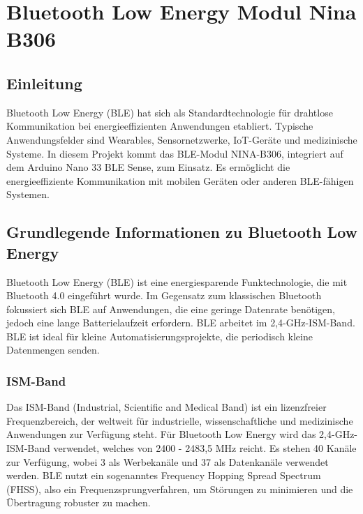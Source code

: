 
\chapter{Bluetooth Low Energy Modul Nina B306}
\label{Nina}

\section{Einleitung}
Bluetooth Low Energy (BLE) hat sich als Standardtechnologie für drahtlose Kommunikation bei energieeffizienten Anwendungen etabliert. Typische Anwendungsfelder sind Wearables, Sensornetzwerke, IoT-Geräte und medizinische Systeme. In diesem Projekt kommt das BLE-Modul NINA-B306, integriert auf dem Arduino Nano 33 BLE Sense, zum Einsatz. Es ermöglicht die energieeffiziente Kommunikation mit mobilen Geräten oder anderen BLE-fähigen Systemen. \cite{Tosi:2017} \cite{UBLOX:2023}

\section{Grundlegende Informationen zu Bluetooth Low Energy}
Bluetooth Low Energy (BLE) ist eine energiesparende Funktechnologie, die mit Bluetooth 4.0 eingeführt wurde. Im Gegensatz zum klassischen Bluetooth fokussiert sich BLE auf Anwendungen, die eine geringe Datenrate benötigen, jedoch eine lange Batterielaufzeit erfordern. BLE arbeitet im 2,4-GHz-ISM-Band. BLE ist ideal für kleine Automatisierungsprojekte, die periodisch kleine Datenmengen senden.\cite{Tosi:2017} \cite{UBLOX:2023}
\subsection{ISM-Band}
Das ISM-Band (Industrial, Scientific and Medical Band) ist ein lizenzfreier Frequenzbereich, der weltweit für industrielle, wissenschaftliche und medizinische Anwendungen zur Verfügung steht. Für Bluetooth Low Energy wird das 2,4-GHz-ISM-Band verwendet, welches von 2400 - 2483,5 MHz reicht. Es stehen 40 Kanäle zur Verfügung, wobei 3 als Werbekanäle und 37 als Datenkanäle verwendet werden. BLE nutzt ein sogenanntes Frequency Hopping Spread Spectrum (FHSS), also ein Frequenzsprungverfahren, um Störungen zu minimieren und die Übertragung robuster zu machen.

